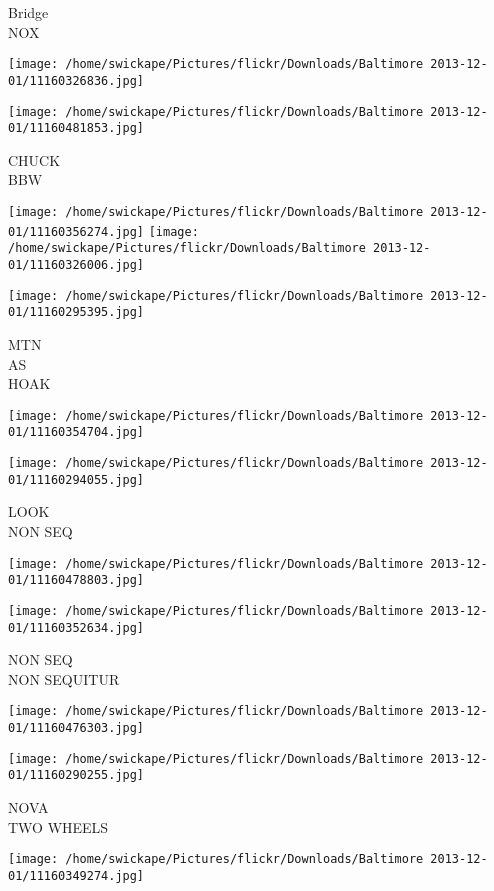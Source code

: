 \documentclass[10pt,letterpaper]{article}
\begin{document}
Bridge\\
NOX
\pagebreak

\texttt{[image: /home/swickape/Pictures/flickr/Downloads/Baltimore 2013-12-01/11160326836.jpg]}

\vspace{0.25in}
\texttt{[image: /home/swickape/Pictures/flickr/Downloads/Baltimore 2013-12-01/11160481853.jpg]}

CHUCK\\
BBW
\pagebreak

\texttt{[image: /home/swickape/Pictures/flickr/Downloads/Baltimore 2013-12-01/11160356274.jpg]}
\texttt{[image: /home/swickape/Pictures/flickr/Downloads/Baltimore 2013-12-01/11160326006.jpg]}

\texttt{[image: /home/swickape/Pictures/flickr/Downloads/Baltimore 2013-12-01/11160295395.jpg]}

MTN\\
AS\\
HOAK
\pagebreak

\texttt{[image: /home/swickape/Pictures/flickr/Downloads/Baltimore 2013-12-01/11160354704.jpg]}

\vspace{0.25in}
\texttt{[image: /home/swickape/Pictures/flickr/Downloads/Baltimore 2013-12-01/11160294055.jpg]}

LOOK\\
NON SEQ
\pagebreak

\texttt{[image: /home/swickape/Pictures/flickr/Downloads/Baltimore 2013-12-01/11160478803.jpg]}

\vspace{0.25in}
\texttt{[image: /home/swickape/Pictures/flickr/Downloads/Baltimore 2013-12-01/11160352634.jpg]}

NON SEQ\\
NON SEQUITUR
\pagebreak

\texttt{[image: /home/swickape/Pictures/flickr/Downloads/Baltimore 2013-12-01/11160476303.jpg]}

\vspace{0.25in}
\texttt{[image: /home/swickape/Pictures/flickr/Downloads/Baltimore 2013-12-01/11160290255.jpg]}

NOVA\\
TWO WHEELS
\pagebreak

\texttt{[image: /home/swickape/Pictures/flickr/Downloads/Baltimore 2013-12-01/11160349274.jpg]}
\end{document}
